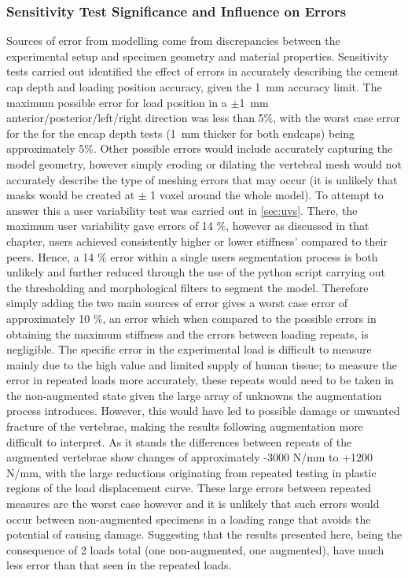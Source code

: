 \subsubsection{Sensitivity Test Significance and Influence on
Errors}\label{sec:errors}

Sources of error from modelling come from discrepancies between the
experimental setup and specimen geometry and material properties. Sensitivity tests carried out
identified the effect of errors in accurately describing the cement cap depth
and loading position accuracy, given the 1~mm accuracy limit. The maximum
possible error for load position in a $\pm$1~mm anterior/posterior/left/right
direction was less than 5\%, with the worst case error for the for the encap
depth tests (1~mm thicker for both endcaps) being approximately 5\%. Other
possible errors would include accurately capturing the model geometry, however
simply eroding or dilating the vertebral mesh would not accurately describe the
type of meshing errors that may occur (it is unlikely that masks would be
created at $\pm$ 1 voxel around the whole model). To attempt to answer this a
user variability test was carried out in \cref{sec:uvs}. There, the maximum
user variability gave errors of 14 \%, however as discussed in that chapter,
users achieved consistently higher or lower stiffness' compared to their peers.
Hence, a 14 \% error within a single users segmentation process is both
unlikely and further reduced through the use of the python script carrying out
the thresholding and morphological filters to segment the model.  Therefore
simply adding the two main sources of error gives a worst case error of
approximately 10 \%, an error which when compared to the possible errors in
obtaining the maximum stiffness and the errors between loading repeats, is
negligible. The specific error in the experimental load is difficult to measure
mainly due to the high value and limited supply of human tissue; to measure the
error in repeated loads more accurately, these repeats would need to be
taken in the non-augmented state given the large array of unknowns the
augmentation process introduces. However, this would have led to possible
damage or unwanted fracture of the vertebrae, making the results following
augmentation more difficult to interpret. As it stands the differences between
repeats of the augmented vertebrae show changes of approximately -3000 N/mm to
+1200 N/mm, with the large reductions originating from  repeated testing in plastic regions
of the load displacement curve. These large errors between repeated measures
are the worst case however and it is unlikely that such errors would occur
between non-augmented specimens in a loading range that avoids the potential of
causing damage. Suggesting that the results presented here, being the
consequence of 2 loads total (one non-augmented, one augmented), have much less
error than that seen in the repeated loads.

